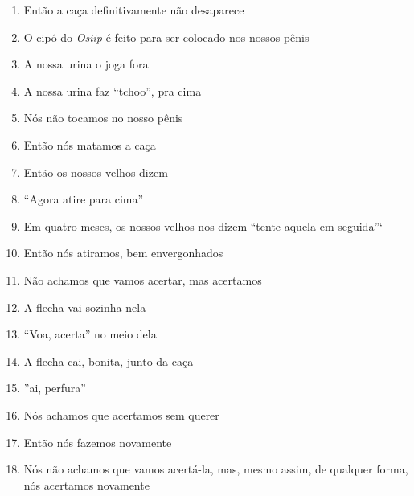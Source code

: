 \begin{enumerate}
 \item Então a caça definitivamente não desaparece

 \item O cipó do \textit{Osiip} é feito para ser colocado nos nossos pênis

 \item A nossa urina o joga fora

 \item A nossa urina faz ``tchoo'', pra cima

 \item Nós não tocamos no nosso pênis

 \item Então nós matamos a caça

 \begin{center}\end{center}

 \item Então os nossos velhos dizem

 \item ``Agora atire para cima''

 \item Em quatro meses, os nossos velhos nos dizem ``tente aquela em
 seguida''`

 \item Então nós atiramos, bem envergonhados

 \item Não achamos que vamos acertar, mas acertamos

 \begin{center}\end{center}

 \item A flecha vai sozinha nela

 \item ``Voa, acerta'' no meio dela

 \item A flecha cai, bonita, junto da caça

 \item ''ai, perfura''

 \item Nós achamos que acertamos sem querer

 \begin{center}\end{center}

 \item Então nós fazemos novamente

 \item Nós não achamos que vamos acertá-la, mas, mesmo assim, de qualquer
 forma, nós acertamos novamente


\end{enumerate}
